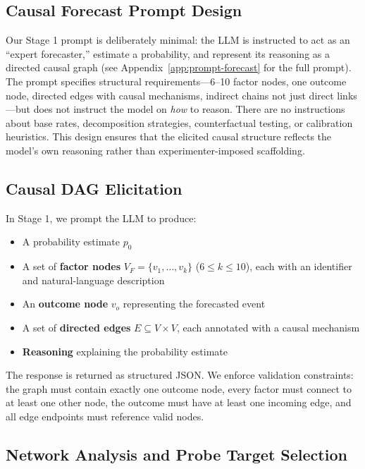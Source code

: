 \documentclass[11pt]{article}
\begin{document}
\subsection{Causal Forecast Prompt Design}
\label{sec:superforecasting}

Our Stage 1 prompt is deliberately minimal: the LLM is instructed to act as an ``expert forecaster,'' estimate a probability, and represent its reasoning as a directed causal graph (see Appendix~\ref{app:prompt-forecast} for the full prompt). The prompt specifies structural requirements---6--10 factor nodes, one outcome node, directed edges with causal mechanisms, indirect chains not just direct links---but does not instruct the model on \emph{how} to reason. There are no instructions about base rates, decomposition strategies, counterfactual testing, or calibration heuristics. This design ensures that the elicited causal structure reflects the model's own reasoning rather than experimenter-imposed scaffolding.

\subsection{Causal DAG Elicitation}
\label{sec:dag}

In Stage 1, we prompt the LLM to produce:
\begin{itemize}
    \item A probability estimate $p_0$
    \item A set of \textbf{factor nodes} $V_F = \{v_1, \ldots, v_k\}$ ($6 \leq k \leq 10$), each with an identifier and natural-language description
    \item An \textbf{outcome node} $v_o$ representing the forecasted event
    \item A set of \textbf{directed edges} $E \subseteq V \times V$, each annotated with a causal mechanism
    \item \textbf{Reasoning} explaining the probability estimate
\end{itemize}

The response is returned as structured JSON. We enforce validation constraints: the graph must contain exactly one outcome node, every factor must connect to at least one other node, the outcome must have at least one incoming edge, and all edge endpoints must reference valid nodes.

\subsection{Network Analysis and Probe Target Selection}
\label{sec:network}
\end{document}
